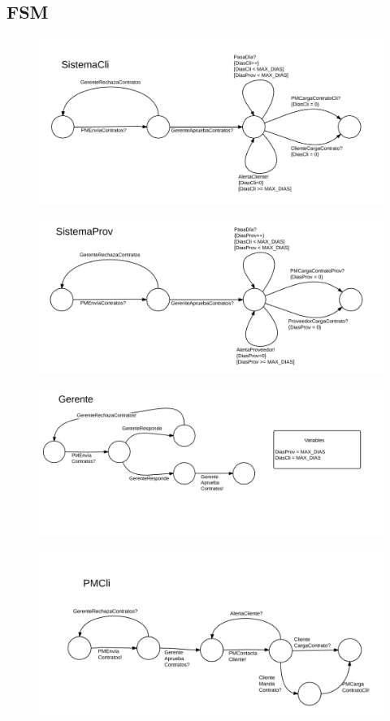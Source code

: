 \subsection{FSM}
\begin{figure}[H]
\includegraphics[width=\linewidth]{diag/viejos/f1.png}
\end{figure}
\begin{figure}[H]
\includegraphics[width=\linewidth]{diag/viejos/f2.png}
\end{figure}
\begin{figure}[H]
\includegraphics[width=\linewidth]{diag/viejos/f3.png}
\end{figure}
\begin{figure}[H]
\includegraphics[width=\linewidth]{diag/viejos/f4.png}
\end{figure}
